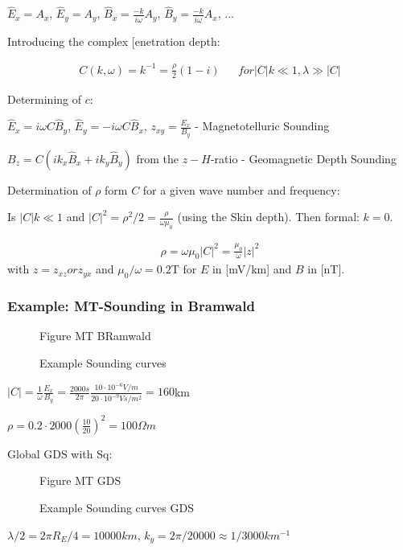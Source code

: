 $\hat{E}_x=A_x$, $\hat{E}_y=A_y$, $\hat{B}_x=\frac{-k}{i\omega}A_y$, $\hat{B}_y=\frac{-k}{i\omega}A_x$, ...

Introducing the complex [enetration depth:

\begin{align}
C(k,\omega)=k^{-1}=\frac{\rho}{2}(1-i) && for |C|k\ll 1, \lambda \gg |C|
\end{align}

Determining of $c$: 

$\hat{E}_x=i\omega C \hat{B}_y$, $\hat{E}_y=-i\omega C \hat{B}_x$, $z_{xy}=\frac{E_x}{B_y}$ - Magnetotelluric Sounding

$B_z=C (i k_x\hat{B}_x+i k_y\hat{B}_y)$ from the $z-H$-ratio - Geomagnetic Depth Sounding


Determination of $\rho$ form $C$ for a given wave number and frequency:

Is $|C|k\ll 1$ and $|C|^2=\rho^2/2=\frac{\rho}{\omega\mu_0}$ (using the Skin depth). Then formal: $k=0$.

\begin{align*}
\rho=\omega\mu_0|C|^2=\frac{\mu_0}{\omega}|z|^2
\end{align*}
with $z=z_{xz} or z_{yx}$ and $\mu_0/\omega=0.2$T for $E$ in [mV/km] and $B$ in [nT].

\subsubsection*{Example: MT-Sounding in Bramwald}

\begin{figure}[h!]
\begin{center}
Figure MT BRamwald 
\caption{Example Sounding curves}
\label{fig:emexample01}
\end{center}
\end{figure}


$|C|=\frac{1}{\omega}\frac{E_x}{B_y}=\frac{2000s}{2\pi}\frac{10\cdot 10^{-6}V/m}{20\cdot 10^{-9}Vs/m^2}=160$km

$\rho=0.2\cdot 2000 \left(\frac{10}{20}\right)^2=100 \Omega m$


Global GDS with Sq:

\begin{figure}[h!]
\begin{center}
Figure MT GDS
\caption{Example Sounding curves GDS}
\label{fig:emexample2}
\end{center}
\end{figure}

$\lambda/2=2\pi R_E/4=10000km$, $k_y=2\pi/20000\approx 1/3000 km^{-1}$

